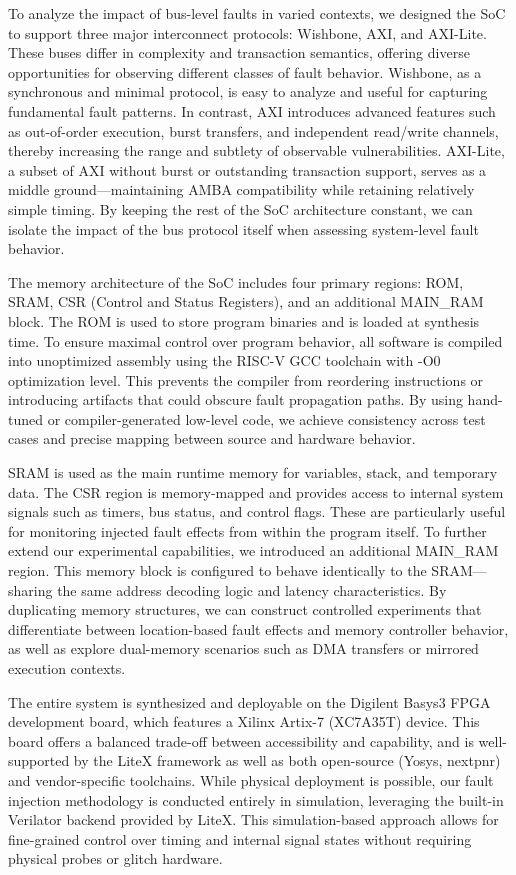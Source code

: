 To analyze the impact of bus-level faults in varied contexts, we designed the SoC to support three major interconnect protocols: Wishbone, AXI, and AXI-Lite. These buses differ in complexity and transaction semantics, offering diverse opportunities for observing different classes of fault behavior. Wishbone, as a synchronous and minimal protocol, is easy to analyze and useful for capturing fundamental fault patterns. In contrast, AXI introduces advanced features such as out-of-order execution, burst transfers, and independent read/write channels, thereby increasing the range and subtlety of observable vulnerabilities. AXI-Lite, a subset of AXI without burst or outstanding transaction support, serves as a middle ground—maintaining AMBA compatibility while retaining relatively simple timing. By keeping the rest of the SoC architecture constant, we can isolate the impact of the bus protocol itself when assessing system-level fault behavior.

The memory architecture of the SoC includes four primary regions: ROM, SRAM, CSR (Control and Status Registers), and an additional MAIN\_RAM block. The ROM is used to store program binaries and is loaded at synthesis time. To ensure maximal control over program behavior, all software is compiled into unoptimized assembly using the RISC-V GCC toolchain with -O0 optimization level. This prevents the compiler from reordering instructions or introducing artifacts that could obscure fault propagation paths. By using hand-tuned or compiler-generated low-level code, we achieve consistency across test cases and precise mapping between source and hardware behavior.

SRAM is used as the main runtime memory for variables, stack, and temporary data. The CSR region is memory-mapped and provides access to internal system signals such as timers, bus status, and control flags. These are particularly useful for monitoring injected fault effects from within the program itself. To further extend our experimental capabilities, we introduced an additional MAIN\_RAM region. This memory block is configured to behave identically to the SRAM—sharing the same address decoding logic and latency characteristics. By duplicating memory structures, we can construct controlled experiments that differentiate between location-based fault effects and memory controller behavior, as well as explore dual-memory scenarios such as DMA transfers or mirrored execution contexts.

The entire system is synthesized and deployable on the Digilent Basys3 FPGA development board, which features a Xilinx Artix-7 (XC7A35T) device. This board offers a balanced trade-off between accessibility and capability, and is well-supported by the LiteX framework as well as both open-source (Yosys, nextpnr) and vendor-specific toolchains. While physical deployment is possible, our fault injection methodology is conducted entirely in simulation, leveraging the built-in Verilator backend provided by LiteX. This simulation-based approach allows for fine-grained control over timing and internal signal states without requiring physical probes or glitch hardware.

